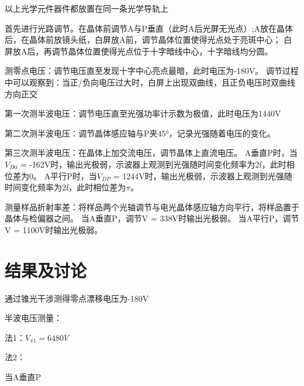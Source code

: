 \documentclass[font=default]{mpltx}
\begin{document}
以上光学元件器件都放置在同一条光学导轨上

首先进行光路调节。在晶体前调节A与P垂直（此时A后光屏无光点）;A放在晶体后，在晶体前放镜头纸，白屏放A前，调节晶体位置使得光点处于亮斑中心；
白屏放A后，再调节晶体位置使得光点位于十字暗线中心，十字暗线均分圆。

测零点电压：调节电压直至发现十字中心亮点最暗，此时电压为-180V。
调节过程中可以观察到：当正/负向电压过大时，白屏上出现双曲线，且正负电压时双曲线方向正交

第一次测半波电压：调节电压直至光强功率计示数为极值，此时电压为1440V

第二次测半波电压：调节晶体感应轴与P夹45°，记录光强随着电压的变化。

第三次测半波电压：在晶体上加交流电压，调节晶体上直流电压。
A垂直P时，当$V_{D0}$ = -162V时，输出光极弱，示波器上观测到光强随时间变化频率为2f，此时相位差为0。
A平行P时，当$V_{DP}$ = 1244V时，输出光极弱，示波器上观测到光强随时间变化频率为2f，此时相位差为$\pi$。

测量样品折射率差：将样品两个光轴调节与电光晶体感应轴方向平行，将样品置于晶体与检偏器之间。
当A垂直P，调节V = 338V时输出光极弱。
当A平行P，调节V = 1100V时输出光极弱。



\section{结果及讨论}
通过锥光干涉测得零点漂移电压为-180V

半波电压测量：

法1：$V_{\pi1} = 6480V$

法2：

当A垂直P
\end{document}
